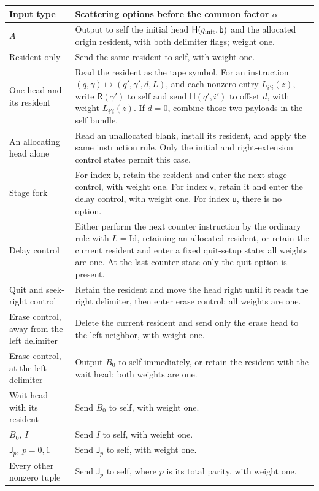 \begin{longtable}{@{}>{\raggedright\arraybackslash}p{.23\linewidth}>{\raggedright\arraybackslash}p{.70\linewidth}@{}}
\toprule
Input type & Scattering options before the common factor \(\alpha\) \\
\midrule
\endhead
\(A\) & Output to self the initial head \(\mathsf H(q_{\rm init},\mathsf b)\) and the allocated origin resident, with both delimiter flags; weight one. \\
Resident only & Send the same resident to self, with weight one. \\
One head and its resident & Read the resident as the tape symbol. For an instruction \((q,\gamma)\mapsto(q',\gamma',d,L)\), and each nonzero entry \(L_{i'i}(z)\), write \(\mathsf R(\gamma')\) to self and send \(\mathsf H(q',i')\) to offset \(d\), with weight \(L_{i'i}(z)\). If \(d=0\), combine those two payloads in the self bundle. \\
An allocating head alone & Read an unallocated blank, install its resident, and apply the same instruction rule. Only the initial and right-extension control states permit this case. \\
Stage fork & For index \(\mathsf b\), retain the resident and enter the next-stage control, with weight one. For index \(\mathsf v\), retain it and enter the delay control, with weight one. For index \(\mathsf u\), there is no option. \\
Delay control & Either perform the next counter instruction by the ordinary rule with \(L=\mathrm{Id}\), retaining an allocated resident, or retain the current resident and enter a fixed quit-setup state; all weights are one. At the last counter state only the quit option is present. \\
Quit and seek-right control & Retain the resident and move the head right until it reads the right delimiter, then enter erase control; all weights are one. \\
Erase control, away from the left delimiter & Delete the current resident and send only the erase head to the left neighbor, with weight one. \\
Erase control, at the left delimiter & Output \(B_0\) to self immediately, or retain the resident with the wait head; both weights are one. \\
Wait head with its resident & Send \(B_0\) to self, with weight one. \\
\(B_0\), \(I\) & Send \(I\) to self, with weight one. \\
\(\mathsf J_p\), \(p=0,1\) & Send \(\mathsf J_p\) to self, with weight one. \\
Every other nonzero tuple & Send \(\mathsf J_p\) to self, where \(p\) is its total parity, with weight one. \\
\bottomrule
\end{longtable}


